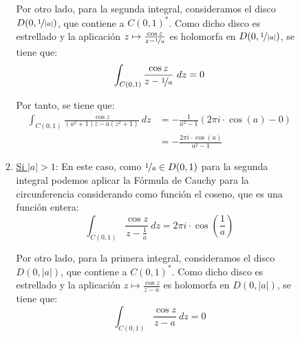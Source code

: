 \begin{ejercicio}
\begin{enumerate}
\begin{description}
\begin{enumerate}
                    Por otro lado, para la segunda integral, consideramos el disco $D(0,\nicefrac{1}{|a|})$, que contiene a $C(0,1)^*$. Como dicho disco es estrellado y la aplicación $z\mapsto \frac{\cos z}{z-\nicefrac{1}{a}}$ es holomorfa en $D(0,\nicefrac{1}{|a|})$, se tiene que:
                    \begin{equation*}
                        \int_{C(0,1)} \frac{\cos z}{z-\nicefrac{1}{a}}\ dz = 0
                    \end{equation*}

                    Por tanto, se tiene que:
                    \begin{align*}
                        \int_{C(0,1)} \frac{\cos z}{(a^2+1)z - a(z^2+1)}\ dz &= -\frac{1}{a^2-1}\left(2\pi i \cdot \cos(a) - 0\right)\\
                        &= -\frac{2\pi i \cdot \cos(a)}{a^2-1}
                    \end{align*}

                    \item \ul{Si $|a|>1$}: En este caso, como $\nicefrac{1}{a}\in D(0,1)$ para la segunda integral podemos aplicar la Fórmula de Cauchy para la circunferencia considerando como función el coseno, que es una función entera:
                    \begin{equation*}
                        \int_{C(0,1)} \frac{\cos z}{z-\frac{1}{a}}\ dz = 2\pi i \cdot \cos\left(\frac{1}{a}\right)
                    \end{equation*}

                    Por otro lado, para la primera integral, consideramos el disco $D(0,|a|)$, que contiene a $C(0,1)^*$. Como dicho disco es estrellado y la aplicación $z\mapsto \frac{\cos z}{z-a}$ es holomorfa en $D(0,|a|)$, se tiene que:
                    \begin{equation*}
                        \int_{C(0,1)} \frac{\cos z}{z-a}\ dz = 0
                    \end{equation*}


\end{enumerate}
\end{description}
\end{enumerate}
\end{ejercicio}
